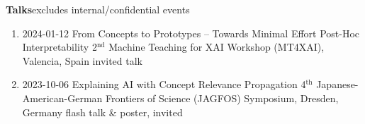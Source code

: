 \headedsection
{\bf Talks}{excludes internal/confidential events}
{
\begin{enumerate}
    \item {}
                    {2024-01-12}
                    {From Concepts to Prototypes -- Towards Minimal Effort Post-Hoc Interpretability}
                    {2$^\text{nd}$ Machine Teaching for XAI Workshop (MT4XAI), Valencia, Spain}
                    {invited talk}

    \item {}
                    {2023-10-06}
                    {Explaining AI with Concept Relevance Propagation}
                    {4$^\text{th}$ Japanese-American-German Frontiers of Science (JAGFOS) Symposium, Dresden, Germany}
                    {flash talk \& poster, invited}


\end{enumerate}}
